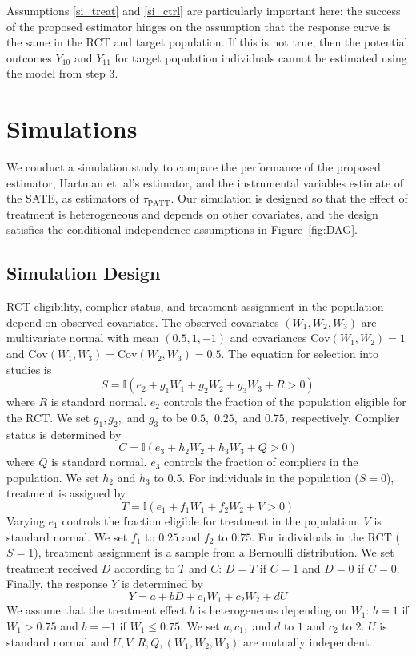 \documentclass[12pt]{article}
\newcommand{\ind}{\mathbb{I}} %
\newcommand{\cov}{\mathrm{Cov}}
\begin{document}
Assumptions \eqref{si_treat} and \eqref{si_ctrl} are particularly important here: the success of the proposed estimator hinges on the assumption that the response curve is the same in the RCT and target population.  If this is not true, then the potential outcomes $Y_{10}$ and $Y_{11}$ for target population individuals cannot be estimated using the model from step 3.



\section{Simulations}
We conduct a simulation study to compare the performance of the proposed estimator, Hartman et. al's estimator, and the instrumental variables estimate of the SATE, as estimators of $\tau_{\text{PATT}}$.  Our simulation is designed so that the effect of treatment is heterogeneous and depends on other covariates, and the design satisfies the conditional independence assumptions in Figure~\ref{fig:DAG}.

\subsection{Simulation Design}
RCT eligibility, complier status, and treatment assignment in the population depend on observed covariates. 
The observed covariates $(W_1, W_2, W_3)$ are multivariate normal with mean $(0.5, 1, -1)$ and covariances $\cov(W_1, W_2) = 1$ and $\cov(W_1, W_3) = \cov(W_2, W_3) = 0.5$. 
 The  equation for selection into studies is
 $$ S = \ind(e_2 + g_1W_1 + g_2W_2 + g_3W_3 + R > 0)$$
  where $R$ is standard normal. $e_2$ controls the fraction of the population eligible for the RCT. We set $g_1, g_2,$ and $g_3$ to be $0.5,$ $0.25,$ and $0.75$, respectively.
Complier status is determined by
$$C = \ind(e_3 + h_2W_2 + h_3W_3 + Q > 0)$$
where $Q$ is standard normal. $e_3$ controls the fraction of compliers in the population. We set $h_2$ and $h_3$ to $0.5$.
 For individuals in the population ($S=0$),  treatment is assigned by
  $$T = \ind(e_1 + f_1W_1 + f_2W_2 + V > 0)$$
Varying $e_1$ controls the fraction eligible for treatment in the population. $V$ is standard normal. We set $f_1$ to $0.25$ and $f_2$ to $0.75$.  For individuals in the RCT ($S=1$), treatment assignment is a sample from a Bernoulli distribution.
We set treatment received $D$ according to $T$ and $C$: $D = T$ if $C=1$ and $D = 0$ if $C=0$.
Finally, the response $Y$ is determined by 
$$Y = a + bD + c_1W_1 + c_2W_2 + dU$$
 We assume that the treatment effect $b$ is heterogeneous depending on $W_1$: $b = 1$ if $W_1 > 0.75$ and $b=-1$ if $W_1 \leq 0.75$.   We set $a, c_1,$ and $d$ to $1$ and $c_2$ to $2$. $U$ is standard normal and $U, V, R, Q, (W_1, W_2, W_3)$ are mutually independent.\\
 
\end{document}
